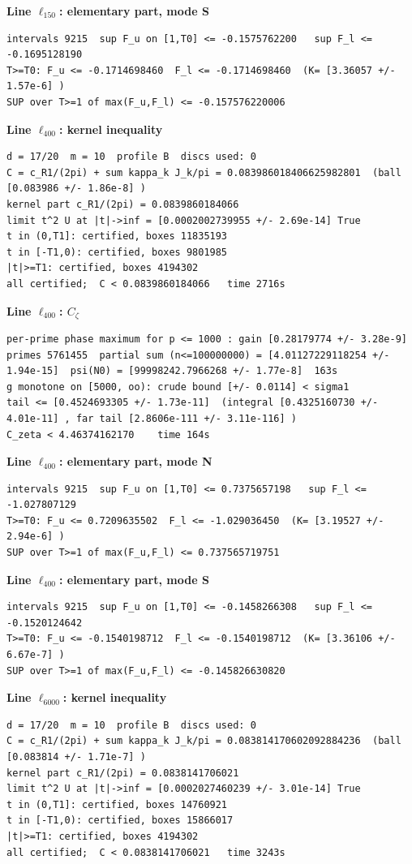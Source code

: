 \documentclass[11pt,reqno]{amsart}
\numberwithin{equation}{section}
\theoremstyle{definition}
\theoremstyle{remark}
\newcommand{\appsub}[1]{\par\medskip\noindent\textbf{#1}\par\nobreak\smallskip}
\begin{document}
\appsub{Line $\ell_{150}$: elementary part, mode S}
\begin{lstlisting}
intervals 9215  sup F_u on [1,T0] <= -0.1575762200   sup F_l <= -0.1695128190
T>=T0: F_u <= -0.1714698460  F_l <= -0.1714698460  (K= [3.36057 +/- 1.57e-6] )
SUP over T>=1 of max(F_u,F_l) <= -0.157576220006
\end{lstlisting}
\appsub{Line $\ell_{400}$: kernel inequality}
\begin{lstlisting}
d = 17/20  m = 10  profile B  discs used: 0
C = c_R1/(2pi) + sum kappa_k J_k/pi = 0.083986018406625982801  (ball [0.083986 +/- 1.86e-8] )
kernel part c_R1/(2pi) = 0.0839860184066
limit t^2 U at |t|->inf = [0.0002002739955 +/- 2.69e-14] True
t in (0,T1]: certified, boxes 11835193
t in [-T1,0): certified, boxes 9801985
|t|>=T1: certified, boxes 4194302
all certified;  C < 0.0839860184066   time 2716s
\end{lstlisting}
\appsub{Line $\ell_{400}$: $C_\zeta$}
\begin{lstlisting}
per-prime phase maximum for p <= 1000 : gain [0.28179774 +/- 3.28e-9]
primes 5761455  partial sum (n<=100000000) = [4.01127229118254 +/- 1.94e-15]  psi(N0) = [99998242.7966268 +/- 1.77e-8]  163s
g monotone on [5000, oo): crude bound [+/- 0.0114] < sigma1
tail <= [0.4524693305 +/- 1.73e-11]  (integral [0.4325160730 +/- 4.01e-11] , far tail [2.8606e-111 +/- 3.11e-116] )
C_zeta < 4.46374162170    time 164s
\end{lstlisting}
\appsub{Line $\ell_{400}$: elementary part, mode N}
\begin{lstlisting}
intervals 9215  sup F_u on [1,T0] <= 0.7375657198   sup F_l <= -1.027807129
T>=T0: F_u <= 0.7209635502  F_l <= -1.029036450  (K= [3.19527 +/- 2.94e-6] )
SUP over T>=1 of max(F_u,F_l) <= 0.737565719751
\end{lstlisting}
\appsub{Line $\ell_{400}$: elementary part, mode S}
\begin{lstlisting}
intervals 9215  sup F_u on [1,T0] <= -0.1458266308   sup F_l <= -0.1520124642
T>=T0: F_u <= -0.1540198712  F_l <= -0.1540198712  (K= [3.36106 +/- 6.67e-7] )
SUP over T>=1 of max(F_u,F_l) <= -0.145826630820
\end{lstlisting}
\appsub{Line $\ell_{6000}$: kernel inequality}
\begin{lstlisting}
d = 17/20  m = 10  profile B  discs used: 0
C = c_R1/(2pi) + sum kappa_k J_k/pi = 0.083814170602092884236  (ball [0.083814 +/- 1.71e-7] )
kernel part c_R1/(2pi) = 0.0838141706021
limit t^2 U at |t|->inf = [0.0002027460239 +/- 3.01e-14] True
t in (0,T1]: certified, boxes 14760921
t in [-T1,0): certified, boxes 15866017
|t|>=T1: certified, boxes 4194302
all certified;  C < 0.0838141706021   time 3243s
\end{lstlisting}
\end{document}
